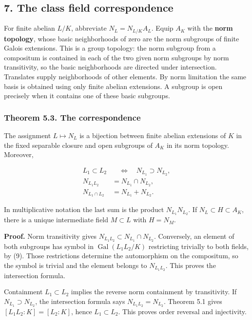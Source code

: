 \documentclass[11pt,a4paper]{article}
\begin{document}
\subsection{7. The class field
correspondence}\label{the-class-field-correspondence}

For finite abelian \(L/K\), abbreviate \(N_L=N_{L/K}A_L\). Equip \(A_K\)
with the \textbf{norm topology}, whose basic neighborhoods of zero are
the norm subgroups of finite Galois extensions. This is a group
topology: the norm subgroup from a compositum is contained in each of
the two given norm subgroups by norm transitivity, so the basic
neighborhoods are directed under intersection. Translates supply
neighborhoods of other elements. By norm limitation the same basis is
obtained using only finite abelian extensions. A subgroup is open
precisely when it contains one of these basic subgroups.

\subsubsection{Theorem 5.3. The
correspondence}\label{theorem-5.3.-the-correspondence}

The assignment \(L\mapsto N_L\) is a bijection between finite abelian
extensions of \(K\) in the fixed separable closure and open subgroups of
\(A_K\) in its norm topology. Moreover,

\[
\begin{aligned}
L_1\subset L_2&\quad\Longleftrightarrow\quad N_{L_1}\supset N_{L_2},\\
N_{L_1L_2}&=N_{L_1}\cap N_{L_2},\\
N_{L_1\cap L_2}&=N_{L_1}+N_{L_2}.
\end{aligned}
\tag{14}
\]

In multiplicative notation the last sum is the product
\(N_{L_1}N_{L_2}\). If \(N_L\subset H\subset A_K\), there is a unique
intermediate field \(M\subset L\) with \(H=N_M\).

\textbf{Proof.} Norm transitivity gives
\(N_{L_1L_2}\subset N_{L_1}\cap N_{L_2}\). Conversely, an element of
both subgroups has symbol in \(\operatorname{Gal}(L_1L_2/K)\)
restricting trivially to both fields, by (9). Those restrictions
determine the automorphism on the compositum, so the symbol is trivial
and the element belongs to \(N_{L_1L_2}\). This proves the intersection
formula.

Containment \(L_1\subset L_2\) implies the reverse norm containment by
transitivity. If \(N_{L_1}\supset N_{L_2}\), the intersection formula
says \(N_{L_1L_2}=N_{L_2}\). Theorem 5.1 gives \([L_1L_2:K]=[L_2:K]\),
hence \(L_1\subset L_2\). This proves order reversal and injectivity.
\end{document}
